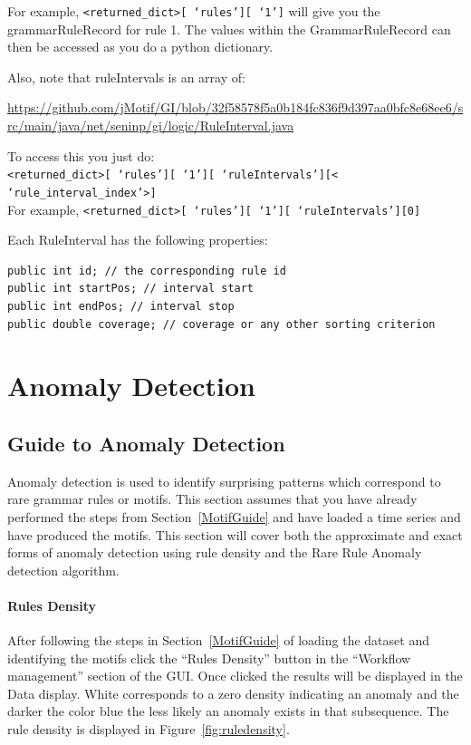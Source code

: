 \documentclass[titlepage, letterpaper, 12pt]{article}
\def\bsq#1{%
	\lq{#1}\rq}
\begin{document}
For example, \texttt{<returned\_dict>[\bsq{rules}][\bsq{1}]} will give you the grammarRuleRecord for rule 1.  The values within the GrammarRuleRecord can then be accessed as you do a python dictionary.

Also, note that ruleIntervals is an array of:

\small{\url{https://github.com/jMotif/GI/blob/32f58578f5a0b184fc836f9d397aa0bfc8e68ee6/src/main/java/net/seninp/gi/logic/RuleInterval.java}}

To access this you just do:\\
\texttt{<returned\_dict>[\bsq{rules}][\bsq{1}][\bsq{ruleIntervals}][<\bsq{rule\_interval\_index}>]}\\
For example,
\texttt{<returned\_dict>[\bsq{rules}][\bsq{1}][\bsq{ruleIntervals}][0]}

Each RuleInterval has the following properties:
\begin{lstlisting}
public int id; // the corresponding rule id
public int startPos; // interval start
public int endPos; // interval stop
public double coverage; // coverage or any other sorting criterion
\end{lstlisting}


\section{Anomaly Detection}
\label{AnomalyGuide}
\subsection{Guide to Anomaly Detection}

Anomaly detection is used to identify surprising patterns which correspond to rare grammar rules or motifs.  This section assumes that you have already performed the steps from Section~\ref{MotifGuide} and have loaded a time series and have produced the motifs.  This section will cover both the approximate and exact forms of anomaly detection using rule density and the Rare Rule Anomaly detection algorithm.


\paragraph{Rules Density} 

After following the steps in Section~\ref{MotifGuide} of loading the dataset and identifying the motifs click the ``Rules Density'' button in the ``Workflow management'' section of the GUI.  Once clicked the results will be displayed in the Data display.  White corresponds to a zero density indicating an anomaly and the darker the color blue the less likely an anomaly exists in that subsequence.  The rule density is displayed in Figure~\ref{fig:ruledensity}.
\end{document}
